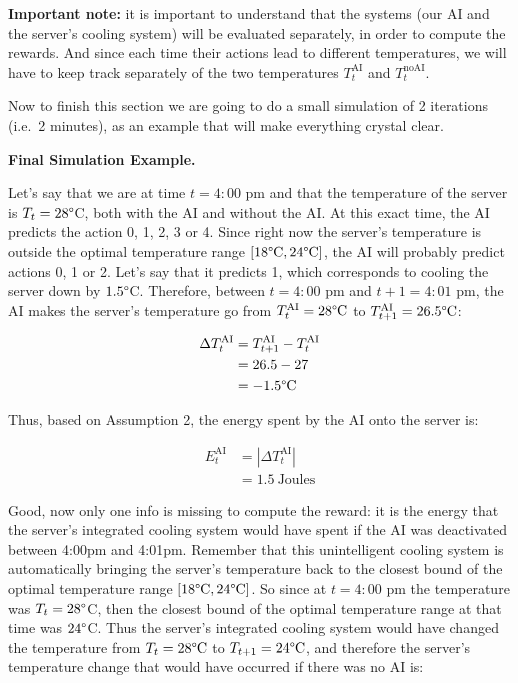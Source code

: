 \documentclass[]{book}
\begin{document}
\textbf{Important note:} it is important to understand that the systems (our AI and the server's cooling system) will be evaluated separately, in order to compute the rewards. And since each time their actions lead to different temperatures, we will have to keep track separately of the two temperatures \(T_t^{\textrm{AI}}\) and \(T_t^{\textrm{noAI}}\).

Now to finish this section we are going to do a small simulation of 2 iterations (i.e.~2 minutes), as an example that will make everything crystal clear.

\textbf{Final Simulation Example.}

Let's say that we are at time \(t = 4:00\) pm and that the temperature of the server is \(T_t = 28 \degree\)C, both with the AI and without the AI. At this exact time, the AI predicts the action 0, 1, 2, 3 or 4. Since right now the server's temperature is outside the optimal temperature range \([18 \degree \textrm{C}, 24 \degree \textrm{C}]\), the AI will probably predict actions 0, 1 or 2. Let's say that it predicts 1, which corresponds to cooling the server down by \(1.5 \degree\)C. Therefore, between \(t = 4:00\) pm and \(t+1 = 4:01\) pm, the AI makes the server's temperature go from \(T_t^{\textrm{AI}} = 28 \degree \textrm{C}\) to \(T_{t+1}^{\textrm{AI}} = 26.5 \degree \textrm{C}\):

\begin{align*}
    \Delta T_t^{\textrm{AI}}
    & = T_{t+1}^{\textrm{AI}} - T_t^{\textrm{AI}} \\
    & = 26.5 - 27 \\
    & = -1.5 \degree \textrm{C}
\end{align*}

Thus, based on Assumption 2, the energy spent by the AI onto the server is:

\begin{align*}
    E_t^{\textrm{AI}}
    & = |\Delta T_t^{\textrm{AI}}| \\
    & = 1.5 \ \textrm{Joules}
\end{align*}

Good, now only one info is missing to compute the reward: it is the energy that the server's integrated cooling system would have spent if the AI was deactivated between 4:00pm and 4:01pm. Remember that this unintelligent cooling system is automatically bringing the server's temperature back to the closest bound of the optimal temperature range \([18 \degree \textrm{C}, 24 \degree \textrm{C}]\). So since at \(t = 4:00\) pm the temperature was \(T_t = 28 \degree\)C, then the closest bound of the optimal temperature range at that time was \(24 \degree\)C. Thus the server's integrated cooling system would have changed the temperature from \(T_t = 28 \degree \textrm{C}\) to \(T_{t+1} = 24 \degree \textrm{C}\), and therefore the server's temperature change that would have occurred if there was no AI is:
\end{document}
